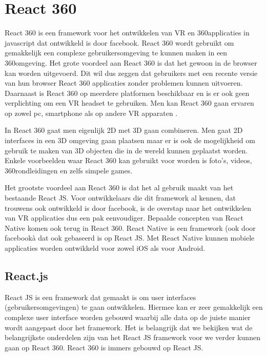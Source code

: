 \chapter{React 360}
\label{ch:react-360}

React 360 is een framework voor het ontwikkelen van VR en 360\textdegree applicaties in javascript dat ontwikkeld is door facebook. React 360 wordt gebruikt om gemakkelijk een complexe gebruikersomgeving te kunnen maken in een 360\textdegree omgeving. Het grote voordeel aan React 360 is dat het gewoon in de browser kan worden uitgevoerd. Dit wil dus zeggen dat gebruikers met een recente versie van hun browser React 360 applicaties zonder problemen kunnen uitvoeren. Daarnaast is React 360 op meerdere platformen beschikbaar en is er ook geen verplichting om een VR headset te gebruiken. Men kan React 360 gaan ervaren op zowel pc, smartphone als op andere VR apparaten \autocite{Lehr2017}.

In React 360 gaat men eigenlijk 2D met 3D gaan combineren. Men gaat 2D interfaces in een 3D omgeving gaan plaatsen maar er is ook de mogelijkheid om gebruik te maken van 3D objecten die in de wereld kunnen geplaatst worden. Enkele voorbeelden waar React 360 kan gebruikt voor worden is foto's, videos, 360\textdegree rondleidingen en zelfs simpele games.

Het grootste voordeel aan React 360 is dat het al gebruik maakt van het bestaande React JS. Voor ontwikkelaars die dit framework al kennen, dat trouwens ook ontwikkeld is door facebook, is de overstap naar het ontwikkelen van VR applicaties dus een pak eenvoudiger. Bepaalde concepten van React Native komen ook terug in React 360. React Native is een framework (ook door facebookà dat ook gebaseerd is op React JS. Met React Native kunnen mobiele applicaties worden ontwikkeld voor zowel iOS als voor Android.

\section{React.js}
\label{sec:reactjs}
React JS is een framework dat gemaakt is om user interfaces (gebruikersomgevingen) te gaan ontwikkelen. Hiermee kan er zeer gemakkelijk een complexe user interface worden gebouwd waarbij alle data op de juiste manier wordt aangepast door het framework. Het is belangrijk dat we bekijken wat de belangrijkste onderdelen zijn van het React JS framework voor we verder kunnen gaan op React 360. React 360 is immers gebouwd op React JS.


